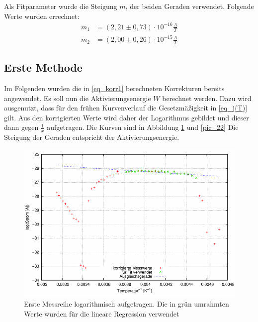 Als Fitparameter wurde die Steigung $m_i$ der beiden Geraden verwendet. Folgende Werte wurden errechnet:\\
\begin{align}
m_1&=(2,21     \pm 0,73) \cdot10^{-16} \frac{A}{T}\\
\label{eq_korr1}
m_2&=( 2,00  \pm0,26)\cdot10^{-15}\frac{A}{T}
\end{align}

\subsection{Erste Methode}
Im Folgenden wurden die in \eqref{eq_korr1} berechneten Korrekturen bereits angewendet. Es soll nun die Aktivierungsenergie $W$ berechnet werden. Dazu wird ausgenutzt, dass für den frühen Kurvenverlauf die Gesetzmäßigkeit in \eqref{eq_j(T)} gilt. Aus den korrigierten Werte wird daher der Logarithmus gebildet und dieser dann gegen $\frac{1}{x}$ aufgetragen. Die Kurven sind in Abbildung \ref{pic_21} und \ref{pic_22} Die Steigung der Geraden entspricht der Aktivierungsenergie.\\

\begin{figure}[H]
\includegraphics[scale=0.8]{../gnu/relax21.pdf}
\caption{Erste Messreihe logarithmisch aufgetragen. Die in grün umrahmten Werte wurden für die lineare Regression verwendet}
\label{pic_21}
\end{figure}

